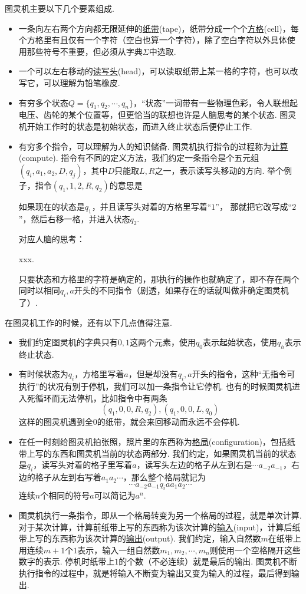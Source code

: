 图灵机主要以下几个要素组成.
\begin{itemize}
    \item 一条向左右两个方向都无限延伸的\underline{纸带}(tape)，纸带分成一个个\underline{方格}(cell)，每个方格里有且仅有一个字符（空白也算一个字符），除了空白字符以外具体使用那些符号不重要，但必须从字典\(\Sigma\)中选取. 
    \item 一个可以左右移动的\underline{读写头}(head)，可以读取纸带上某一格的字符，也可以改写它，可以理解为铅笔橡皮.
    \item 有穷多个状态\(Q=\{q_1, q_2, \cdots, q_n\}\)，“状态”一词带有一些物理色彩，令人联想起电压、齿轮的某个位置等，但更恰当的联想也许是人脑思考的某个状态. 图灵机开始工作时的状态是初始状态，而进入终止状态后便停止工作.
    \item 有穷多个指令，可以理解为人的知识储备. 图灵机执行指令的过程称为\underline{计算}(compute). 指令有不同的定义方法，我们约定一条指令是个五元组\((q_i, a_1, a_2, D, q_j)\)，其中\(D\)只能取\(L,R\)之一，表示读写头移动的方向. 举个例子，指令\((q_1,1,2,R,q_2)\)的意思是
    \begin{center}
        如果现在的状态是\(q_1\)，并且读写头对着的方格里写着“\(1\)”，\newline
    那就把它改写成“\(2\)”，然后右移一格，并进入状态\(q_2\).
    \end{center}
    对应人脑的思考：
    \begin{center}
        xxx.
    \end{center}
    只要状态和方格里的字符是确定的，那执行的操作也就确定了，即不存在两个同时以相同\(q_i,a\)开头的不同指令（剧透，如果存在的话就叫做非确定图灵机了）.
\end{itemize}
在图灵机工作的时候，还有以下几点值得注意.
\begin{itemize}
    \item 我们约定图灵机的字典只有\(0,1\)这两个元素，使用\(q_0\)表示起始状态，使用\(q_h\)表示终止状态.
    \item 有时候状态为\(q_i\)，方格里写着\(a\)，但是却没有\(q_i,a\)开头的指令，这种“无指令可执行”的状况有别于停机，我们可以加一条指令让它停机. 也有的时候图灵机进入死循环而无法停机，比如指令中有两条
    \[(q_1,0,0,R,q_2), (q_1,0,0,L,q_0)\]
    这样的图灵机遇到全\(0\)的纸带，就会来回移动而永远不会停机.
    \item 在任一时刻给图灵机拍张照，照片里的东西称为\underline{格局}(configuration)，包括纸带上写的东西和图灵机当前的状态两部分. 我们约定，如果图灵机当前的状态是\(q_i\)，读写头对着的格子里写着\(a\)，读写头左边的格子从左到右是\(\cdots a_{-2}a_{-1}\)，右边的格子从左到右写着\(a_1a_2\cdots\)，那么整个格局就记为
    \[\cdots a_{-2}a_{-1}q_iaa_1a_2\cdots\]
    连续\(n\)个相同的符号\(a\)可以简记为\(a^n\).
    \item 图灵机执行一条指令，即从一个格局转变为另一个格局的过程，就是单次计算. 对于某次计算，计算前纸带上写的东西称为该次计算的\underline{输入}(input)，计算后纸带上写的东西称为该次计算的\underline{输出}(output). 我们约定，输入自然数\(m\)在纸带上用连续\(m+1\)个\(1\)表示，输入一组自然数\(m_1,m_2,\cdots,m_n\)则使用一个空格隔开这些数字的表示. 停机时纸带上\(1\)的个数（不必连续）就是最后的输出. 图灵机不断执行指令的过程中，就是将输入不断变为输出又变为输入的过程，最后得到输出.
\end{itemize}

